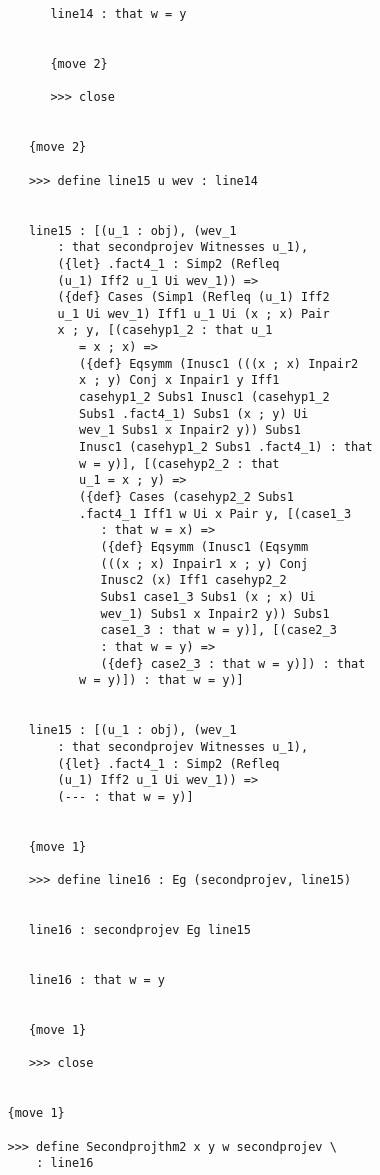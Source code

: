 \documentclass[12pt]{article}
\begin{document}
\begin{verbatim}
         line14 : that w = y


         {move 2}

         >>> close


      {move 2}

      >>> define line15 u wev : line14


      line15 : [(u_1 : obj), (wev_1 
          : that secondprojev Witnesses u_1), 
          ({let} .fact4_1 : Simp2 (Refleq 
          (u_1) Iff2 u_1 Ui wev_1)) => 
          ({def} Cases (Simp1 (Refleq (u_1) Iff2 
          u_1 Ui wev_1) Iff1 u_1 Ui (x ; x) Pair 
          x ; y, [(casehyp1_2 : that u_1 
             = x ; x) => 
             ({def} Eqsymm (Inusc1 (((x ; x) Inpair2 
             x ; y) Conj x Inpair1 y Iff1 
             casehyp1_2 Subs1 Inusc1 (casehyp1_2 
             Subs1 .fact4_1) Subs1 (x ; y) Ui 
             wev_1 Subs1 x Inpair2 y)) Subs1 
             Inusc1 (casehyp1_2 Subs1 .fact4_1) : that 
             w = y)], [(casehyp2_2 : that 
             u_1 = x ; y) => 
             ({def} Cases (casehyp2_2 Subs1 
             .fact4_1 Iff1 w Ui x Pair y, [(case1_3 
                : that w = x) => 
                ({def} Eqsymm (Inusc1 (Eqsymm 
                (((x ; x) Inpair1 x ; y) Conj 
                Inusc2 (x) Iff1 casehyp2_2 
                Subs1 case1_3 Subs1 (x ; x) Ui 
                wev_1) Subs1 x Inpair2 y)) Subs1 
                case1_3 : that w = y)], [(case2_3 
                : that w = y) => 
                ({def} case2_3 : that w = y)]) : that 
             w = y)]) : that w = y)]


      line15 : [(u_1 : obj), (wev_1 
          : that secondprojev Witnesses u_1), 
          ({let} .fact4_1 : Simp2 (Refleq 
          (u_1) Iff2 u_1 Ui wev_1)) => 
          (--- : that w = y)]


      {move 1}

      >>> define line16 : Eg (secondprojev, line15)


      line16 : secondprojev Eg line15


      line16 : that w = y


      {move 1}

      >>> close


   {move 1}

   >>> define Secondprojthm2 x y w secondprojev \
       : line16



\end{verbatim}
\end{document}
